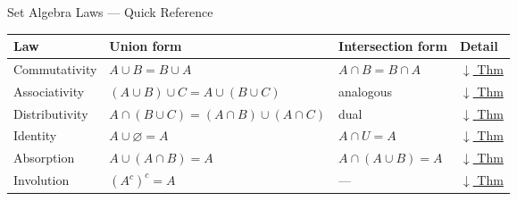 \begin{toolkitbox}{Set Algebra Laws --- Quick Reference}
\small
\begin{tabular}{l l l l}
\toprule
\textbf{Law} & \textbf{Union form} & \textbf{Intersection form} & \textbf{Detail} \\
\midrule
Commutativity  & $A \cup B = B \cup A$          & $A \cap B = B \cap A$          & \hyperref[thm:commutativity]{$\downarrow$ Thm} \\
Associativity  & $(A \cup B) \cup C = A \cup (B \cup C)$  & analogous   & \hyperref[thm:associativity]{$\downarrow$ Thm} \\
Distributivity & $A \cap (B \cup C) = (A \cap B) \cup (A \cap C)$ & dual   & \hyperref[thm:distributivity]{$\downarrow$ Thm} \\
Identity       & $A \cup \varnothing = A$        & $A \cap U = A$                 & \hyperref[thm:identity-absorption]{$\downarrow$ Thm} \\
Absorption     & $A \cup (A \cap B) = A$         & $A \cap (A \cup B) = A$        & \hyperref[thm:identity-absorption]{$\downarrow$ Thm} \\
Involution     & $(A^c)^c = A$                  & ---                            & \hyperref[thm:involution]{$\downarrow$ Thm} \\
\bottomrule
\end{tabular}
\end{toolkitbox}


